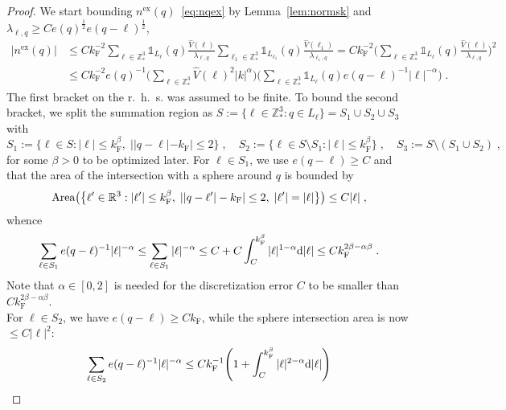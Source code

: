 \documentclass[12pt,a4paper]{article}
\numberwithin{equation}{section}
\newcommand{\1}{\mathbb{I}}
\newcommand{\di}{\textnormal{d}}
\newcommand{\ex}{\mathrm{ex}}
\newcommand{\F}{\mathrm{F}}
\newcommand{\R}{\mathbb{R}}
\newcommand{\Z}{\mathbb{Z}}
\newcommand{\half}{\frac{1}{2}}
\theoremstyle{plain}
\theoremstyle{definition}
\theoremstyle{remark}
\theoremstyle{plain}
\theoremstyle{definition}
\theoremstyle{remark}
\begin{document}
\begin{proof}
We start bounding $ n^{\ex}(q) $~\eqref{eq:nqex} by Lemma~\ref{lem:normsk} and $ \lambda_{\ell,q} \ge C e(q)^{\half} e(q-\ell)^{\half} $,
\begin{align}
	|n^{\ex}(q)|
	&\leq C k_{\F}^{-2}
		\sum_{\ell \in \Z^3_*} \mathds{1}_{L_\ell}(q) \frac{\hat{V}(\ell)}{\lambda_{\ell,q}}
		\sum_{\ell_1 \in \Z^3_*} \mathds{1}_{L_{\ell_1}}(q) \frac{\hat{V}(\ell_1)}{\lambda_{\ell_1,q}}
	= C k_{\F}^{-2}
		\Bigg( \sum_{\ell \in \Z^3_*} \mathds{1}_{L_\ell}(q) \frac{\hat{V}(\ell)}{\lambda_{\ell,q}} \Bigg)^2 \nonumber\\
	&\leq C k_{\F}^{-2} e(q)^{-1}
		\Bigg( \sum_{\ell \in \Z^3_*} \hat{V}(\ell)^2 |k|^{\alpha} \Bigg)
		\Bigg( \sum_{\ell \in \Z^3_*} \mathds{1}_{L_\ell}(q) e(q-\ell)^{-1} |\ell|^{-\alpha} \Bigg) \;.
\end{align}
The first bracket on the r.~h.~s. was assumed to be finite. To bound the second bracket, we split the summation region as $ S := \{ \ell \in \Z^3_* : q \in L_\ell \} = S_1 \cup S_2 \cup S_3 $ with
\begin{equation}
	S_1 := \{ \ell \in S : |\ell| \le k_{\F}^\beta, \; ||q-\ell|-k_{\F}| \le 2 \} \;, \quad
	S_2 := \{ \ell \in S \setminus S_1 : |\ell| \le k_{\F}^\beta \} \;, \quad
	S_3 := S \setminus (S_1 \cup S_2) \;,
\end{equation}
for some $ \beta > 0 $ to be optimized later. For $ \ell \in S_1 $, we use $ e(q-\ell) \ge C $ and that the area of the intersection with a sphere around $ q $ is bounded by
\begin{equation*}
	\textnormal{Area} \big( \big\{ \ell' \in \R^3 : |\ell'| \le k_{\F}^\beta, \; ||q-\ell'|-k_{\F}| \le 2, \; |\ell'| = |\ell| \big\} \big)
	\leq C |\ell| \;,
\end{equation*}
whence
\begin{equation}
	\sum_{\ell \in S_1} e(q-\ell)^{-1} |\ell|^{-\alpha}
	\leq \sum_{\ell \in S_1} |\ell|^{-\alpha}
	\leq C + C \int_C^{k_{\F}^\beta} |\ell|^{1-\alpha}  \di |\ell|
	\le C k_{\F}^{2 \beta - \alpha \beta} \;.
\end{equation}
Note that $ \alpha \in [0,2] $ is needed for the discretization error $ C $ to be smaller than $C k_{\F}^{2 \beta - \alpha \beta} $.\\
For $ \ell \in S_2 $, we have $ e(q-\ell) \ge C k_{\F} $, while the sphere intersection area is now $ \leq C |\ell|^2 $:
\begin{equation}
	\sum_{\ell \in S_2} e(q-\ell)^{-1} |\ell|^{-\alpha}
	\leq C k_{\F}^{-1} \Bigg( 1 + \int_C^{k_{\F}^\beta} |\ell|^{2-\alpha} \di |\ell| \Bigg)

\end{equation}
\end{proof}
\end{document}
